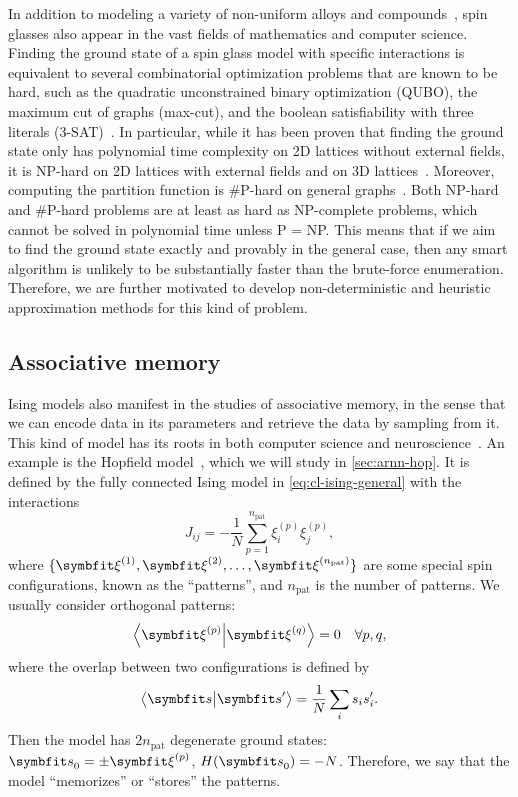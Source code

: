 In addition to modeling a variety of non-uniform alloys and compounds~\cite{mydosh2015spin}, spin glasses also appear in the vast fields of mathematics and computer science. Finding the ground state of a spin glass model with specific interactions is equivalent to several combinatorial optimization problems that are known to be hard, such as the quadratic unconstrained binary optimization (QUBO), the maximum cut of graphs (max-cut), and the boolean satisfiability with three literals (3-SAT)~\cite{karp1972reducibility}. In particular, while it has been proven that finding the ground state only has polynomial time complexity on 2D lattices without external fields, it is NP-hard on 2D lattices with external fields and on 3D lattices~\cite{barahona1982computational}. Moreover, computing the partition function is \#P-hard on general graphs~\cite{galanis2016inapproximability, fefferman2017exact, peters2020location}. Both NP-hard and \#P-hard problems are at least as hard as NP-complete problems, which cannot be solved in polynomial time unless P = NP. This means that if we aim to find the ground state exactly and provably in the general case, then any smart algorithm is unlikely to be substantially faster than the brute-force enumeration. Therefore, we are further motivated to develop non-deterministic and heuristic approximation methods for this kind of problem.

\subsection{Associative memory}
\label{sec:hopfield}

Ising models also manifest in the studies of associative memory, in the sense that we can encode data in its parameters and retrieve the data by sampling from it. This kind of model has its roots in both computer science and neuroscience~\cite{carpenter1989neural}. An example is the Hopfield model~\cite{hopfield1982neural, amit1985spin}, which we will study in \cref{sec:arnn-hop}. It is defined by the fully connected Ising model in \cref{eq:cl-ising-general} with the interactions
\begin{equation}
J_{i j} = -\frac{1}{N} \sum_{p = 1}^{n_\text{pat}} \xi^{(p)}_i \xi^{(p)}_j,
\label{eq:hopfield}
\end{equation}
where $\{\vxi^{(1)}, \vxi^{(2)}, \ldots, \vxi^{(n_\text{pat})}\}$ are some special spin configurations, known as the ``patterns'', and $n_\text{pat}$ is the number of patterns. We usually consider orthogonal patterns:
\begin{equation}
\ip{\vxi^{(p)}}{\vxi^{(q)}} = 0 \quad \forall p, q,
\label{eq:cl-ortho}
\end{equation}
where the overlap between two configurations is defined by
\begin{equation}
\ip{\vs}{\vs'} = \frac{1}{N} \sum_i s_i s'_i.
\label{eq:cl-overlap}
\end{equation}
Then the model has $2 n_\text{pat}$ degenerate ground states: $\vs_0 = \pm \vxi^{(p)}$, $H(\vs_0) = -N$. Therefore, we say that the model ``memorizes'' or ``stores'' the patterns.

